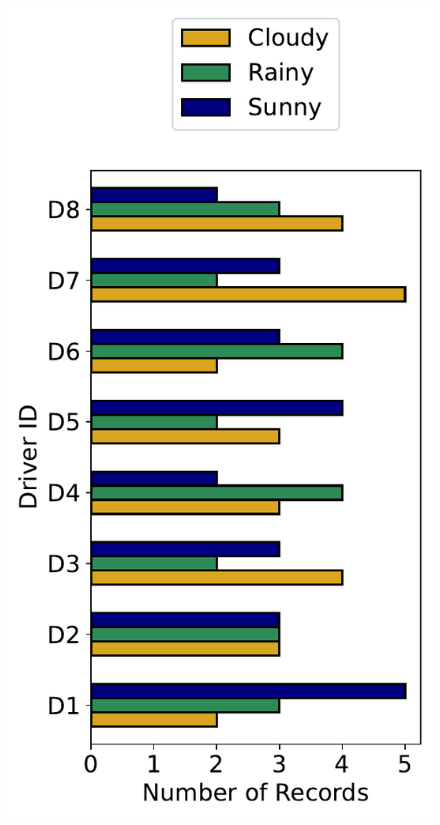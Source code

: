\begin{figure}[h]
\begin{minipage}{0.33\textwidth}
        \centering
        \includegraphics[width=\textwidth]{images/dreyeve/weather_distrib.pdf}
    \end{minipage}\hfill
    \begin{minipage}{0.33\textwidth}
        \centering

\end{minipage}
\end{figure}
